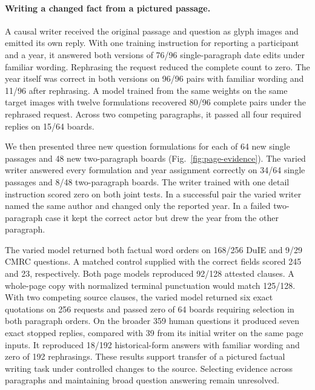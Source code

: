 \paragraph{Writing a changed fact from a pictured passage.}
A causal writer received the original passage and question as glyph images and emitted its own reply. With one training instruction for reporting a participant and a year, it answered both versions of 76/96 single-paragraph date edits under familiar wording. Rephrasing the request reduced the complete count to zero. The year itself was correct in both versions on 96/96 pairs with familiar wording and 11/96 after rephrasing. A model trained from the same weights on the same target images with twelve formulations recovered 80/96 complete pairs under the rephrased request. Across two competing paragraphs, it passed all four required replies on 15/64 boards.

We then presented three new question formulations for each of 64 new single passages and 48 new two-paragraph boards (Fig.~\ref{fig:page-evidence}). The varied writer answered every formulation and year assignment correctly on 34/64 single passages and 8/48 two-paragraph boards. The writer trained with one detail instruction scored zero on both joint tests. In a successful pair the varied writer named the same author and changed only the reported year. In a failed two-paragraph case it kept the correct actor but drew the year from the other paragraph.

The varied model returned both factual word orders on 168/256 DuIE and 9/29 CMRC questions. A matched control supplied with the correct fields scored 245 and 23, respectively. Both page models reproduced 92/128 attested clauses. A whole-page copy with normalized terminal punctuation would match 125/128. With two competing source clauses, the varied model returned six exact quotations on 256 requests and passed zero of 64 boards requiring selection in both paragraph orders. On the broader 359 human questions it produced seven exact stopped replies, compared with 39 from its initial writer on the same page inputs. It reproduced 18/192 historical-form answers with familiar wording and zero of 192 rephrasings. These results support transfer of a pictured factual writing task under controlled changes to the source. Selecting evidence across paragraphs and maintaining broad question answering remain unresolved.
